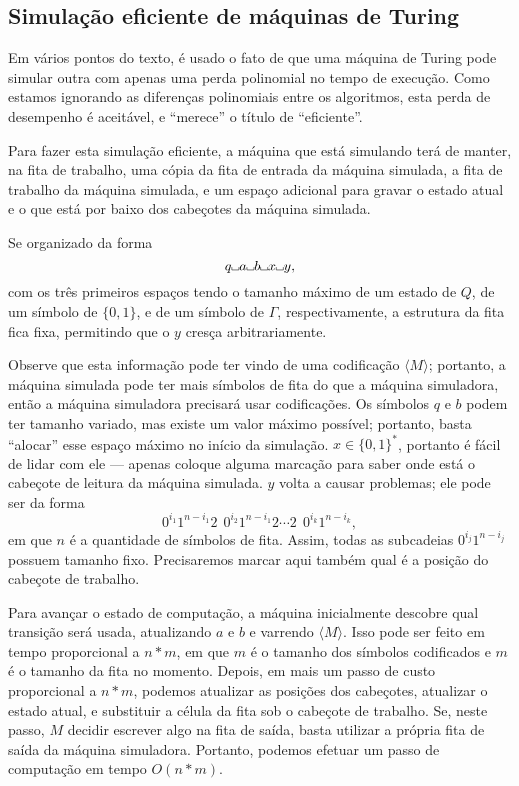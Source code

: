 \subsection{Simulação eficiente de máquinas de Turing}

Em vários pontos do texto,
é usado o fato de que uma máquina de Turing pode simular outra
com apenas uma perda polinomial no tempo de execução.
Como estamos ignorando as diferenças polinomiais entre os algoritmos,
esta perda de desempenho é aceitável,
e ``merece'' o título de ``eficiente''.

Para fazer esta simulação eficiente,
a máquina que está simulando terá de manter, na fita de trabalho,
uma cópia da fita de entrada da máquina simulada,
a fita de trabalho da máquina simulada,
e um espaço adicional para gravar o estado atual
e o que está por baixo dos cabeçotes da máquina simulada.

Se organizado da forma
\begin{equation*}
    q \B a \B b \B x \B y,
\end{equation*}
com os três primeiros espaços tendo o tamanho máximo de um estado de $Q$,
de um símbolo de $\{0, 1\}$, e de um símbolo de $\Gamma$,
respectivamente,
a estrutura da fita fica fixa,
permitindo que o $y$ cresça arbitrariamente.

Observe que esta informação pode ter vindo de uma codificação $\langle M \rangle$;
portanto, a máquina simulada pode ter mais símbolos de fita
do que a máquina simuladora,
então a máquina simuladora precisará usar codificações.
Os símbolos $q$ e $b$ podem ter tamanho variado,
mas existe um valor máximo possível;
portanto, basta ``alocar'' esse espaço máximo no início da simulação.
$x \in \{0, 1\}^*$, portanto é fácil de lidar com ele
--- apenas coloque alguma marcação para saber onde está o cabeçote de leitura
da máquina simulada.
$y$ volta a causar problemas;
ele pode ser da forma
\begin{equation*}
    0^{i_1} 1^{n-i_1} 2\ \ 0^{i_2} 1^{n-i_1} 2 \cdots 2\ \ 0^{i_k} 1^{n-i_k},
\end{equation*}
em que $n$ é a quantidade de símbolos de fita.
Assim, todas as subcadeias $0^{i_j} 1^{n-i_j}$ possuem tamanho fixo.
Precisaremos marcar aqui também qual é a posição do cabeçote de trabalho.

Para avançar o estado de computação,
a máquina inicialmente descobre qual transição será usada,
atualizando $a$ e $b$
e varrendo $\langle M \rangle$.
Isso pode ser feito em tempo proporcional a $n*m$,
em que $m$ é o tamanho dos símbolos codificados
e $m$ é o tamanho da fita no momento.
Depois,
em mais um passo de custo proporcional a $n*m$,
podemos atualizar as posições dos cabeçotes,
atualizar o estado atual,
e substituir a célula da fita sob o cabeçote de trabalho.
Se, neste passo,
$M$ decidir escrever algo na fita de saída,
basta utilizar a própria fita de saída da máquina simuladora.
Portanto, podemos efetuar um passo de computação em tempo $O(n * m)$.

